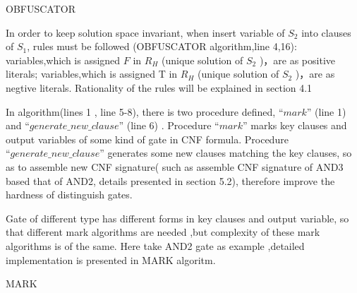 \documentclass[runningheads,a4paper]{llncs}
\begin{document}
\begin{algorithm}
\caption{OBFUSCATOR}
\label{algo_obs}
\end{algorithm}








In order to keep solution space invariant, when insert variable of $S_2$ into clauses of $S_1$, rules must be followed (OBFUSCATOR algorithm,line 4,16):
variables,which is assigned $F$ in $R_H$ (unique solution of $S_2$ )，are as positive literals;
variables,which is assigned T in $R_H$ (unique solution of $S_2$ )，are as negtive literals. 
Rationality of the rules will be explained in section 4.1

In algorithm(lines 1 , line 5-8), there is two procedure defined, $“mark”$ (line 1) and $“generate\_new\_clause”$ (line 6) . 
Procedure $“mark”$ marks key clauses and output variables of some kind of gate in CNF formula.
Procedure $“generate\_new\_clause”$ generates some new clauses matching the key clauses, so as to  assemble new CNF signature( such as assemble CNF signature of AND3 based that of AND2, 
details presented in section 5.2), therefore improve the hardness of distinguish gates.

Gate of different type has different forms in key clauses and output variable, so that different mark algorithms are needed ,but complexity of these mark algorithms is of the same. 
Here take AND2 gate as example ,detailed implementation is presented in MARK algoritm.  

\begin{algorithm}
\caption{MARK}
\label{algo_mark}
\end{algorithm}
\end{document}
